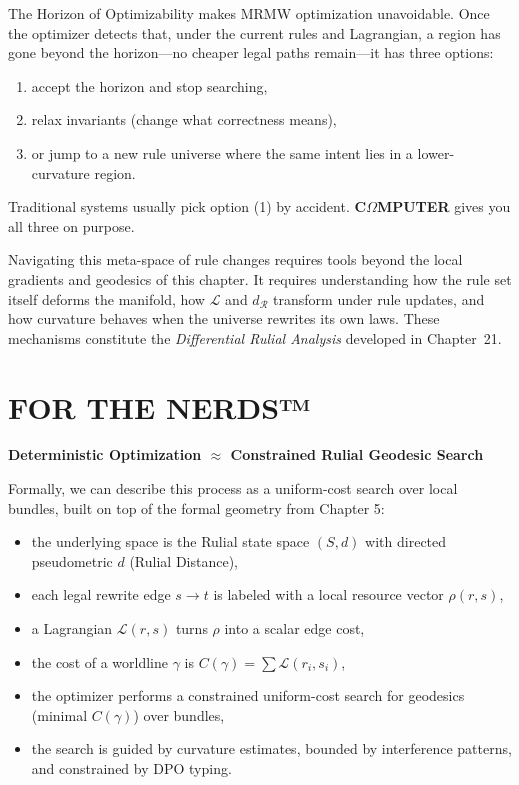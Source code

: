 The Horizon of Optimizability makes MRMW optimization unavoidable. Once the optimizer detects that, under the current rules and Lagrangian, a region has gone beyond the horizon—no cheaper legal paths remain—it has three options:

\begin{enumerate}
  \item accept the horizon and stop searching,
  \item relax invariants (change what correctness means),
  \item or jump to a new rule universe where the same intent lies in a lower-curvature region.
\end{enumerate}

Traditional systems usually pick option (1) by accident. \textbf{C$\Omega$MPUTER} gives you all three on purpose.

\noindent
Navigating this meta-space of rule changes requires tools beyond the local gradients and geodesics of this chapter. It requires understanding how the rule set itself deforms the manifold, how $\mathcal{L}$ and $d_{\mathcal{R}}$ transform under rule updates, and how curvature behaves when the universe rewrites its own laws. These mechanisms constitute the \emph{Differential Rulial Analysis} developed in Chapter~21.

\section*{FOR THE NERDS™}

\textbf{Deterministic Optimization $\approx$ Constrained Rulial Geodesic Search}

Formally, we can describe this process as a uniform-cost search over local bundles, built on top of the formal geometry from Chapter 5:

\begin{itemize}
  \item the underlying space is the Rulial state space $(S, d)$ with directed pseudometric $d$ (Rulial Distance),
  \item each legal rewrite edge $s \to t$ is labeled with a local resource vector $\rho(r,s)$,
  \item a Lagrangian $\mathcal{L}(r,s)$ turns $\rho$ into a scalar edge cost,
  \item the cost of a worldline $\gamma$ is $C(\gamma) = \sum \mathcal{L}(r_i,s_i)$,
  \item the optimizer performs a constrained uniform-cost search for geodesics (minimal $C(\gamma)$) over bundles,
  \item the search is guided by curvature estimates, bounded by interference patterns, and constrained by DPO typing.
\end{itemize}

